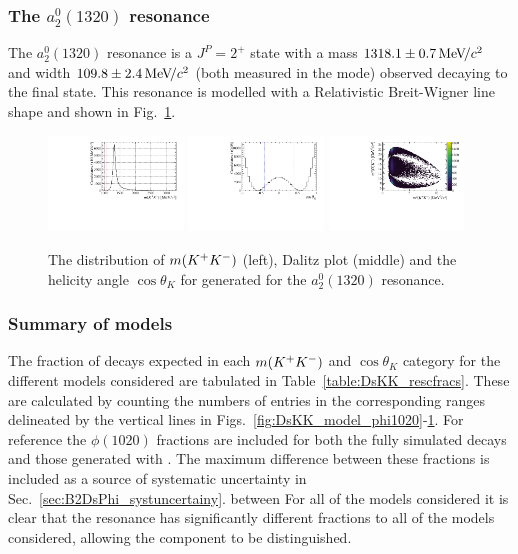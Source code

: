 \subsubsection{The $a_{2}^{0}(1320)$ resonance}
The $a_{2}^{0}(1320)$ resonance is a $J^{P} = 2^{+}$ state with a mass $1318.1\pm0.7{\mathrm{\,Me\kern -0.1em V\!/}c^2}$ and width $109.8\pm2.4{\mathrm{\,Me\kern -0.1em V\!/}c^2}$ (both measured in the \kaon\Kb mode) observed decaying to the \kaon\Kb final state. This resonance is modelled with a Relativistic Breit-Wigner line shape and shown in Fig.~\ref{fig:DsKK_model_a21320}.
\begin{figure}[!h]
   \centering   
   \includegraphics[width=0.32\textwidth]{figs/B2DsPhi/a2_1320_phi_mass.pdf}
   \includegraphics[width=0.32\textwidth]{figs/B2DsPhi/a2_1320_Helicity.pdf}
   \includegraphics[width=0.32\textwidth]{figs/B2DsPhi/a2_1320_Dalitz_plot.pdf}
   \caption{The distribution of $m({{K}^+}{{K}^-})$ (left), Dalitz plot (middle) and the helicity angle $\cos\theta_{K}$ for generated for the $a_{2}^{0}(1320)$ resonance.} 
   \label{fig:DsKK_model_a21320}   
\end{figure}



\subsubsection{Summary of models}

The fraction of decays expected in each $m({{K}^+}{{K}^-})$ and $\cos\theta_{K}$ category for the different models considered are tabulated in Table~\ref{table:DsKK_rescfracs}. These are calculated by counting the numbers of entries in the corresponding ranges delineated by the vertical lines in Figs.~\ref{fig:DsKK_model_phi1020}-\ref{fig:DsKK_model_a21320}. For reference the $\phi(1020)$ fractions are included for both the fully simulated decays and those generated with \laurapp. The maximum difference between these fractions is included as a source of systematic uncertainty in Sec.~\ref{sec:B2DsPhi_systuncertainy}.
between For all of the models considered it is clear that the \phiz resonance has significantly different fractions to all of the models considered, allowing the component to be distinguished.   


